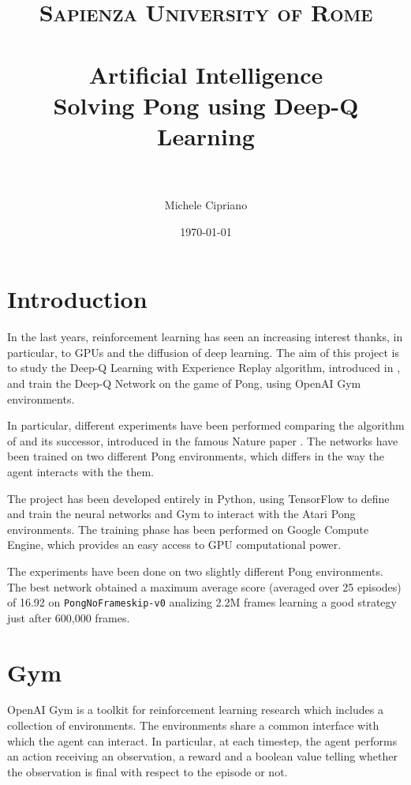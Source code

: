\documentclass[a4paper]{article}
\title{
\normalfont \normalsize
\textsc{Sapienza University of Rome} \\ [25pt] %
\horrule{0.5pt} \\[0.4cm] %
\LARGE Artificial Intelligence \\ %
\large Solving Pong using Deep-Q Learning \\
\horrule{2pt} \\[0.5cm] %
}
\author{Michele Cipriano} %
\date{\normalsize\today} %
\numberwithin{equation}{section} %
\numberwithin{figure}{section} %
\numberwithin{table}{section} %
\theoremstyle{definition}
\begin{document}
\sloppy %

\maketitle %


\section{Introduction}

In the last years, reinforcement learning has seen an increasing interest thanks,
in particular, to GPUs and the diffusion of deep learning. The aim of this
project is to study the Deep-Q Learning with Experience Replay
algorithm, introduced in \cite{mnih2013playing}, and train
the Deep-Q Network on the game of Pong, using OpenAI Gym environments\cite{openai-gym}.

In particular, different experiments have been performed comparing the algorithm
of \cite{mnih2013playing} and its successor, introduced in the famous Nature
paper \cite{mnih2015humanlevel}. The networks have been trained on two different
Pong environments, which differs in the way the agent interacts with the them.

The project has been developed entirely in Python, using TensorFlow to define and
train the neural networks and Gym to interact with the Atari Pong environments.
The training phase has been performed on Google Compute Engine, which provides an
easy access to GPU computational power.

The experiments have been done on two slightly different Pong environments.
The best network obtained a maximum average score (averaged over 25 episodes) of
16.92 on \texttt{PongNoFrameskip-v0} analizing 2.2M frames learning a good
strategy just after 600,000 frames.


\section{Gym}

OpenAI Gym is a toolkit for reinforcement learning research which includes a
collection of environments. The environments share a common interface with which
the agent can interact. In particular, at each timestep, the agent performs an
action receiving an observation, a reward and a boolean value telling whether the
observation is final with respect to the episode or not.
\end{document}

